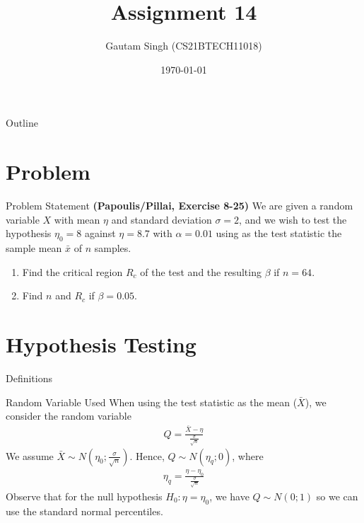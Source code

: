\documentclass{beamer}
\title{Assignment 14}
\author{Gautam Singh (CS21BTECH11018)}
\date{\today}
\begin{document}
\begin{frame}
    \titlepage 
\end{frame}

\begin{frame}{Outline}
    \tableofcontents
\end{frame}

\section{Problem}
\begin{frame}{Problem Statement}
	\textbf{(Papoulis/Pillai, Exercise 8-25)} We are given a random variable $X$ with mean $\eta$ and standard deviation $\sigma = 2$, and we wish to test the hypothesis $\eta_0 = 8$ against $\eta = 8.7$ with $\alpha = 0.01$ using as the test statistic the sample mean $\bar{x}$ of $n$ samples.
	\begin{enumerate}
		\item Find the critical region $R_c$ of the test and the resulting $\beta$ if $n = 64$. 
		\item Find $n$ and $R_c$ if $\beta = 0.05$.
	\end{enumerate}
\end{frame}

\section{Hypothesis Testing}
\begin{frame}{Definitions}
	\begin{alertblock}{Random Variable Used}
		When using the test statistic as the mean ($\bar{X}$), we consider the random variable
		\begin{align}
			Q = \frac{\bar{X} - \eta}{\frac{\sigma}{\sqrt{n}}}
			\label{eq:Q}
		\end{align}
		We assume $\bar{X} \sim N(\eta_0 ; \frac{\sigma}{\sqrt{n}})$. Hence, $Q \sim N(\eta_q ; 0)$, where
		\begin{align}
			\eta_q = \frac{\eta - \eta_0}{\frac{\sigma}{\sqrt{n}}}
			\label{eq:eta-q}
		\end{align}
		Observe that for the null hypothesis $H_0: \eta = \eta_0$, we have $Q \sim N(0; 1)$ so we can use the standard normal percentiles.
	\end{alertblock}
\end{frame}
\end{document}
